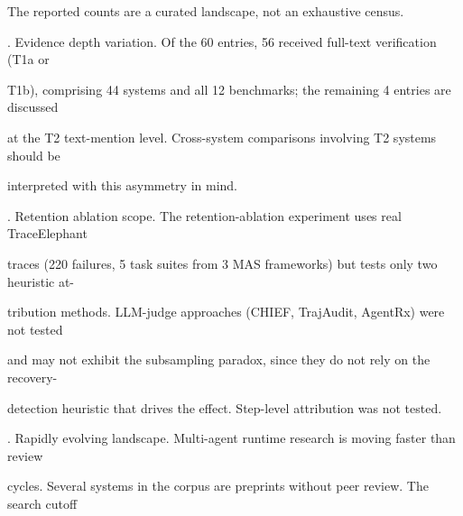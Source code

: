 \begin{flushleft}
\noindent  The reported counts are a curated landscape, not an exhaustive census.\par
{}. Evidence depth variation. Of the 60 entries, 56 received full-text verification (T1a or\par
\noindent  T1b), comprising 44 systems and all 12 benchmarks; the remaining 4 entries are discussed\par
\noindent  at the T2 text-mention level. Cross-system comparisons involving T2 systems should be\par
\noindent  interpreted with this asymmetry in mind.\par
{}. Retention ablation scope. The retention-ablation experiment uses real TraceElephant\par
\noindent  traces (220 failures, 5 task suites from 3 MAS frameworks) but tests only two heuristic at-\par
\noindent  tribution methods. LLM-judge approaches (CHIEF, TrajAudit, AgentRx) were not tested\par
\noindent  and may not exhibit the subsampling paradox, since they do not rely on the recovery-\par
\noindent  detection heuristic that drives the effect. Step-level attribution was not tested.\par
{}. Rapidly evolving landscape. Multi-agent runtime research is moving faster than review\par
\noindent  cycles. Several systems in the corpus are preprints without peer review. The search cutoff\par
\end{flushleft}
